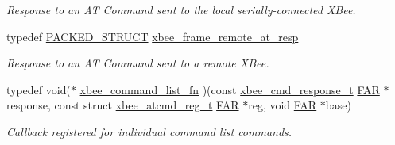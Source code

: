 \begin{DoxyCompactItemize}
\begin{DoxyCompactList}\small\item\em Response to an A\-T Command sent to the local serially-\/connected X\-Bee. \end{DoxyCompactList}\item 
typedef \hyperlink{group___s_x_a_ga4233297bd31be5c273d4fb0758cc54d7}{P\-A\-C\-K\-E\-D\-\_\-\-S\-T\-R\-U\-C\-T} \hyperlink{group__xbee__atcmd_ga5c11edcb9c5f6b11eec5d5d1c37cfbfd}{xbee\-\_\-frame\-\_\-remote\-\_\-at\-\_\-resp}
\begin{DoxyCompactList}\small\item\em Response to an A\-T Command sent to a remote X\-Bee. \end{DoxyCompactList}\item 
typedef void($\ast$ \hyperlink{group__xbee__atcmd_ga0d223ca5aacf39a0469f444fae5d1503}{xbee\-\_\-command\-\_\-list\-\_\-fn} )(const \hyperlink{structxbee__cmd__response__t}{xbee\-\_\-cmd\-\_\-response\-\_\-t} \hyperlink{group__hal_gaef060b3456fdcc093a7210a762d5f2ed}{F\-A\-R} $\ast$response, const struct \hyperlink{structxbee__atcmd__reg__t}{xbee\-\_\-atcmd\-\_\-reg\-\_\-t} \hyperlink{group__hal_gaef060b3456fdcc093a7210a762d5f2ed}{F\-A\-R} $\ast$reg, void \hyperlink{group__hal_gaef060b3456fdcc093a7210a762d5f2ed}{F\-A\-R} $\ast$base)
\begin{DoxyCompactList}\small\item\em Callback registered for individual command list commands. \end{DoxyCompactList}\end{DoxyCompactItemize}

